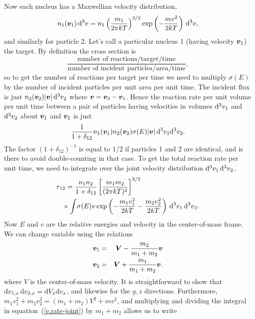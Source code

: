 Now each nucleus has a Maxwellian velocity distribution,
\begin{equation}\label{e.maxwell}
n_{1}(\boldsymbol{v}_{1})\,\mathrm{d}^{3}v = n_{1}\left(\frac{m_{1}}{2\pi kT}\right)^{3/2}\exp\left(-\frac{mv^{2}}{2kT}\right) \,\mathrm{d}^{3}v,
\end{equation}
and similarly for particle 2.  Let's call a particular nucleus 1 (having velocity $\boldsymbol{v}_{1}$) the target. By definition the cross section is 
\[ \frac{\textrm{number of reactions}/\textrm{target}/\textrm{time}}{\textrm{number of incident particles}/\textrm{area}/\textrm{time}},
\]
so to get the number of reactions per target per time we need to multiply $\sigma(E)$ by the number of incident particles per unit area per unit time.  The incident flux is just $n_{2}(\boldsymbol{v}_{2})|\boldsymbol{v}|\,\mathrm{d}^{3}v_{2}$ where $\boldsymbol{v}=\boldsymbol{v}_{2}-\boldsymbol{v}_{1}$.  Hence the reaction rate per unit volume per unit time between a pair of particles having velocities in volumes $\mathrm{d}^{3}v_{1}$ and $\mathrm{d}^{3}v_{2}$ about $\boldsymbol{v}_{1}$ and $\boldsymbol{v}_{2}$ is just
\[
\frac{1}{1+\delta_{12}} n_{1}(\boldsymbol{v}_{1})n_{2}(\boldsymbol{v}_{2})\sigma(E)|\boldsymbol{v}| \,\mathrm{d}^{3}v_{1}\mathrm{d}^{3}v_{2}.
\]
The factor $(1+\delta_{12})^{-1}$ is equal to $1/2$ if particles 1 and 2 are identical, and is there to avoid double-counting in that case. To get the total reaction rate per unit time, we need to integrate over the joint velocity distribution $\mathrm{d}^{3}v_{1}\,\mathrm{d}^{3}v_{2}$,
\begin{eqnarray}\label{e.rate-joint}
\lefteqn{r_{12} = \frac{n_{1}n_{2}}{1+\delta_{12}}  \left[\frac{m_{1}m_{2}}{(2\pi kT)^{2}}\right]^{3/2}}
  \nonumber\\ &&\times\int\! \sigma(E) v\exp\left(-\frac{m_{1}v_{1}^{2}}{2kT}-\frac{m_{2}v_{2}^{2}}{2kT}\right)  \,\dif^{3} v_{1}\,\dif^{3}v_{2}.
\end{eqnarray}
Now $E$ and $v$ are the relative energies and velocity in the center-of-mass frame.  We can change variable using the relations
\begin{eqnarray*}
\boldsymbol{v}_{1} &=& \boldsymbol{V} - \frac{m_{2}}{m_{1}+m_{2}} \boldsymbol{v}\\
\boldsymbol{v}_{2} &=& \boldsymbol{V} + \frac{m_{1}}{m_{1}+m_{2}} \boldsymbol{v}.
\end{eqnarray*}
where $V$ is the center-of-mass velocity. It is straightforward to show that $\mathrm{d} v_{1,x}\,\mathrm{d} v_{2,x} = \mathrm{d} V_{x}\mathrm{d} v_{x}$, and likewise for the $y,z$ directions.  Furthermore, $m_{1}v_{1}^{2} + m_{2}v_{2}^{2} = (m_{1}+m_{2})V^{2} + m v^{2}$, and multiplying and dividing the integral in equation~(\ref{e.rate-joint}) by $m_{1}+m_{2}$ allows us to write
